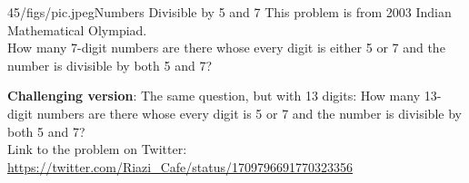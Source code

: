 \begin{problem}{45/figs/pic.jpeg}{Numbers Divisible by 5 and 7}
	This problem is from 2003 Indian Mathematical Olympiad.\\[0.2cm]
	
	How many 7-digit numbers are there whose every digit is either 5 or 7 and the number is divisible by both 5 and 7?
	
	\textbf{Challenging version}: The same question, but with 13 digits: How many 13-digit numbers are there whose every digit is 5 or 7 and the number is divisible by both 5 and 7?\\[0.2cm]
	
Link to the problem on Twitter:  \url{https://twitter.com/Riazi_Cafe/status/1709796691770323356}\end{problem}